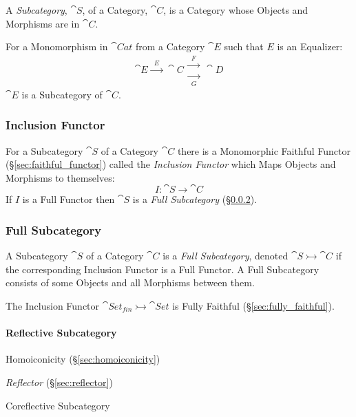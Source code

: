 A \emph{Subcategory}, $\cat{S}$, of a Category, $\cat{C}$, is a
Category whose Objects and Morphisms are in $\cat{C}$.

For a Monomorphism in $\cat{Cat}$ from a Category $\cat{E}$ such
that $E$ is an Equalizer:
\[
  \cat{E} \xrightarrow{\;\;E\;\;} \cat{C}
  \begin{matrix}
  \xrightarrow{\;\;F\;\;}\\
  \xrightarrow[\;\;G\;\;]{}
  \end{matrix}
  \cat{D}
\]
$\cat{E}$ is a Subcategory of $\cat{C}$.



\subsubsection{Inclusion Functor}\label{sec:inclusion_functor}

For a Subcategory $\cat{S}$ of a Category $\cat{C}$ there is a
Monomorphic Faithful Functor (\S\ref{sec:faithful_functor}) called the
\emph{Inclusion Functor} which Maps Objects and Morphisms to
themselves:
\[
  I : \cat{S} \rightarrow \cat{C}
\]
If $I$ is a Full Functor then $\cat{S}$ is a \emph{Full
  Subcategory} (\S\ref{sec:full_subcategory}).



\subsubsection{Full Subcategory}\label{sec:full_subcategory}

A Subcategory $\cat{S}$ of a Category $\cat{C}$ is a \emph{Full
  Subcategory}, denoted $\cat{S} \rightarrowtail \cat{C}$ if the
corresponding Inclusion Functor is a Full Functor. A Full Subcategory
consists of some Objects and all Morphisms between them.

The Inclusion Functor $\cat{Set}_{fin} \rightarrowtail
\cat{Set}$ is Fully Faithful (\S\ref{sec:fully_faithful}).



\paragraph{Reflective Subcategory}\label{sec:reflective_subcategory}\hfill

Homoiconicity (\S\ref{sec:homoiconicity})

\emph{Reflector} (\S\ref{sec:reflector})

Coreflective Subcategory

